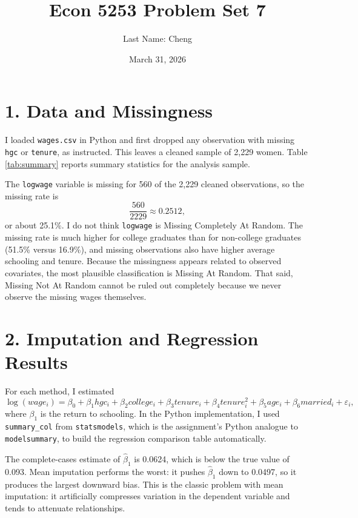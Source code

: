 \documentclass[11pt]{article}
\title{Econ 5253 Problem Set 7}
\author{Last Name: Cheng}
\date{March 31, 2026}
\begin{document}
\maketitle

\section*{1. Data and Missingness}
I loaded \texttt{wages.csv} in Python and first dropped any observation with missing \texttt{hgc} or \texttt{tenure}, as instructed.
This leaves a cleaned sample of 2,229 women.
Table \ref{tab:summary} reports summary statistics for the analysis sample.



The \texttt{logwage} variable is missing for 560 of the 2,229 cleaned observations, so the missing rate is
\[
\frac{560}{2229} \approx 0.2512,
\]
or about 25.1\%.
I do not think \texttt{logwage} is Missing Completely At Random.
The missing rate is much higher for college graduates than for non-college graduates (51.5\% versus 16.9\%), and missing observations also have higher average schooling and tenure.
Because the missingness appears related to observed covariates, the most plausible classification is Missing At Random.
That said, Missing Not At Random cannot be ruled out completely because we never observe the missing wages themselves.

\section*{2. Imputation and Regression Results}
For each method, I estimated
\[
\log(wage_i) = \beta_0 + \beta_1 hgc_i + \beta_2 college_i + \beta_3 tenure_i + \beta_4 tenure_i^2 + \beta_5 age_i + \beta_6 married_i + \varepsilon_i,
\]
where \(\beta_1\) is the return to schooling.
In the Python implementation, I used \texttt{summary\_col} from \texttt{statsmodels}, which is the assignment's Python analogue to \texttt{modelsummary}, to build the regression comparison table automatically.



The complete-cases estimate of \(\hat{\beta}_1\) is 0.0624, which is below the true value of 0.093.
Mean imputation performs the worst: it pushes \(\hat{\beta}_1\) down to 0.0497, so it produces the largest downward bias.
This is the classic problem with mean imputation: it artificially compresses variation in the dependent variable and tends to attenuate relationships.
\end{document}
